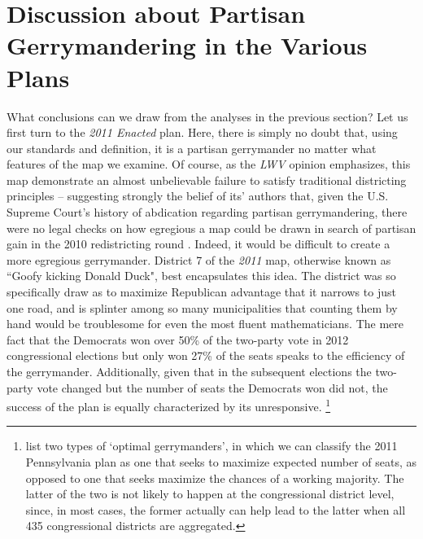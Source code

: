 \section{Discussion about Partisan Gerrymandering in the Various Plans}
What conclusions can we draw from the analyses in the previous section? Let us first turn to the \textit{2011 Enacted} plan. Here, there is simply no doubt that, using our standards and definition, it is a partisan gerrymander no matter what features of the map we examine. Of course, as the \textit{LWV} opinion emphasizes, this map demonstrate an almost unbelievable failure to satisfy traditional districting principles -- suggesting strongly the belief of its' authors that, given the U.S. Supreme Court’s history of abdication regarding partisan gerrymandering, there were no legal checks on how egregious a map could be drawn in search of partisan gain in the 2010 redistricting round \citep{McGann_et_al_2016_gerrymandering}. Indeed, it would be difficult to create a more egregious gerrymander. District 7 of the \textit{2011} map, otherwise known as ``Goofy kicking Donald Duck", best encapsulates this idea. The district was so specifically draw as to maximize Republican advantage that it narrows to just one road, and is splinter among so many municipalities that counting them by hand would be troublesome for even the most fluent mathematicians. The mere fact that the Democrats won over 50\% of the two-party vote in 2012 congressional elections but only won 27\% of the seats speaks to the efficiency of the gerrymander. Additionally, given that in the subsequent elections the two-party vote changed but the number of seats the Democrats won did not, the success of the plan is equally characterized by its unresponsive.
        \footnote{\citet{Owen1988} list two types of `optimal gerrymanders', in which we can classify the 2011 Pennsylvania plan as one that seeks to maximize expected number of seats, as opposed to one that seeks maximize the chances of a working majority.  The latter of the two is not likely to happen at the congressional district level, since, in most cases, the former actually can help lead to the latter when all 435 congressional districts are aggregated.}
